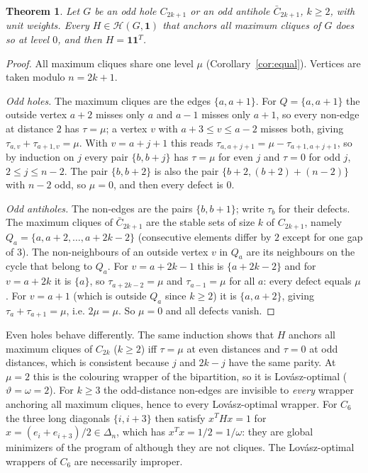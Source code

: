\documentclass[11pt]{article}
\newtheorem{thm}{Theorem}[section]
\theoremstyle{definition}
\theoremstyle{remark}
\newcommand{\Hc}{\mathcal{H}}
\newcommand{\one}{\mathbf{1}}
\begin{document}
\begin{thm}
\label{thm:holes}
Let $G$ be an odd hole $C_{2k+1}$ or an odd antihole $\bar C_{2k+1}$,
$k\geq2$, with unit weights. Every $H\in\Hc(G,\one)$ that anchors all
maximum cliques of $G$ does so at level $0$, and then $H=\one\one^T$.
\end{thm}
\begin{proof}
All maximum cliques share one level $\mu$ (Corollary~\ref{cor:equal}).
Vertices are taken modulo $n=2k+1$.

{\em Odd holes.} The maximum cliques are the edges $\{a,a+1\}$. For
$Q=\{a,a+1\}$ the outside vertex $a+2$ misses only $a$ and $a-1$ misses
only $a+1$, so every non-edge at distance $2$ has $\tau=\mu$; a vertex $v$
with $a+3\leq v\leq a-2$ misses both, giving
$\tau_{a,v}+\tau_{a+1,v}=\mu$. With $v=a+j+1$ this reads
$\tau_{a,a+j+1}=\mu-\tau_{a+1,a+j+1}$, so by induction on $j$ every pair
$\{b,b+j\}$ has $\tau=\mu$ for even $j$ and $\tau=0$ for odd $j$,
$2\leq j\leq n-2$. The pair $\{b,b+2\}$ is also the pair
$\{b+2,(b+2)+(n-2)\}$ with $n-2$ odd, so $\mu=0$, and then every defect is
$0$.

{\em Odd antiholes.} The non-edges are the pairs $\{b,b+1\}$; write
$\tau_b$ for their defects. The maximum cliques of $\bar C_{2k+1}$ are the
stable sets of size $k$ of $C_{2k+1}$, namely
$Q_a=\{a,a+2,\ldots,a+2k-2\}$ (consecutive elements differ by $2$ except for
one gap of $3$). The non-neighbours of an outside vertex $v$ in $Q_a$ are
its neighbours on the cycle that belong to $Q_a$. For $v=a+2k-1$ this is
$\{a+2k-2\}$ and for $v=a+2k$ it is $\{a\}$, so $\tau_{a+2k-2}=\mu$ and
$\tau_{a-1}=\mu$ for all $a$: every defect equals $\mu$. For $v=a+1$ (which
is outside $Q_a$ since $k\geq2$) it is $\{a,a+2\}$, giving
$\tau_a+\tau_{a+1}=\mu$, i.e. $2\mu=\mu$. So $\mu=0$ and all defects vanish.
\end{proof}

Even holes behave differently. The same induction shows that $H$ anchors all
maximum cliques of $C_{2k}$ ($k\geq2$) iff $\tau=\mu$ at even distances and
$\tau=0$ at odd distances, which is consistent because $j$ and $2k-j$ have
the same parity. At $\mu=2$ this is the colouring wrapper of the
bipartition, so it is Lov\'asz-optimal ($\vartheta=\omega=2$). For $k\geq3$
the odd-distance non-edges are invisible to {\em every} wrapper anchoring
all maximum cliques, hence to every Lov\'asz-optimal wrapper. For $C_6$ the
three long diagonals $\{i,i+3\}$ then satisfy $x^THx=1$ for
$x=(e_i+e_{i+3})/2\in\Delta_n$, which has $x^Tx=1/2=1/\omega$: they are
global minimizers of the program of \cite[Theorem~1]{CW} although they are not
cliques. The Lov\'asz-optimal wrappers of $C_6$ are necessarily improper.
\end{document}
